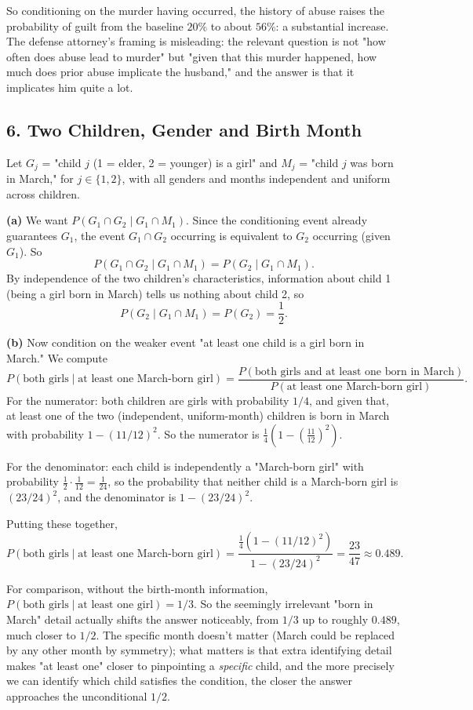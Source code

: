 \documentclass{article}
\begin{document}
So conditioning on the murder having occurred, the history of abuse raises the probability of guilt from the baseline $20\%$ to about $56\%$: a substantial increase. The defense attorney's framing is misleading: the relevant question is not "how often does abuse lead to murder" but "given that this murder happened, how much does prior abuse implicate the husband," and the answer is that it implicates him quite a lot.

\subsection*{6. Two Children, Gender and Birth Month}

Let $G_j$ = "child $j$ (1 = elder, 2 = younger) is a girl" and $M_j$ = "child $j$ was born in March," for $j\in\{1,2\}$, with all genders and months independent and uniform across children.

\textbf{(a)} We want $P(G_1\cap G_2 \mid G_1\cap M_1)$. Since the conditioning event already guarantees $G_1$, the event $G_1\cap G_2$ occurring is equivalent to $G_2$ occurring (given $G_1$). So
$$P(G_1\cap G_2\mid G_1\cap M_1) = P(G_2\mid G_1\cap M_1).$$
By independence of the two children's characteristics, information about child 1 (being a girl born in March) tells us nothing about child 2, so
$$P(G_2\mid G_1\cap M_1) = P(G_2) = \frac{1}{2}.$$

\medskip
\textbf{(b)} Now condition on the weaker event "at least one child is a girl born in March." We compute
$$
P(\text{both girls}\mid \text{at least one March-born girl}) = \frac{P(\text{both girls and at least one born in March})}{P(\text{at least one March-born girl})}.
$$
For the numerator: both children are girls with probability $1/4$, and given that, at least one of the two (independent, uniform-month) children is born in March with probability $1-(11/12)^2$. So the numerator is $\frac{1}{4}\left(1-\left(\frac{11}{12}\right)^2\right)$.

For the denominator: each child is independently a "March-born girl" with probability $\frac{1}{2}\cdot\frac{1}{12} = \frac{1}{24}$, so the probability that neither child is a March-born girl is $(23/24)^2$, and the denominator is $1-(23/24)^2$.

Putting these together,
$$
P(\text{both girls}\mid\text{at least one March-born girl}) = \frac{\tfrac14\left(1-(11/12)^2\right)}{1-(23/24)^2} = \frac{23}{47} \approx 0.489.
$$

For comparison, without the birth-month information, $P(\text{both girls}\mid \text{at least one girl}) = 1/3$. So the seemingly irrelevant "born in March" detail actually shifts the answer noticeably, from $1/3$ up to roughly $0.489$, much closer to $1/2$. The specific month doesn't matter (March could be replaced by any other month by symmetry); what matters is that extra identifying detail makes "at least one" closer to pinpointing a \emph{specific} child, and the more precisely we can identify which child satisfies the condition, the closer the answer approaches the unconditional $1/2$.
\end{document}
